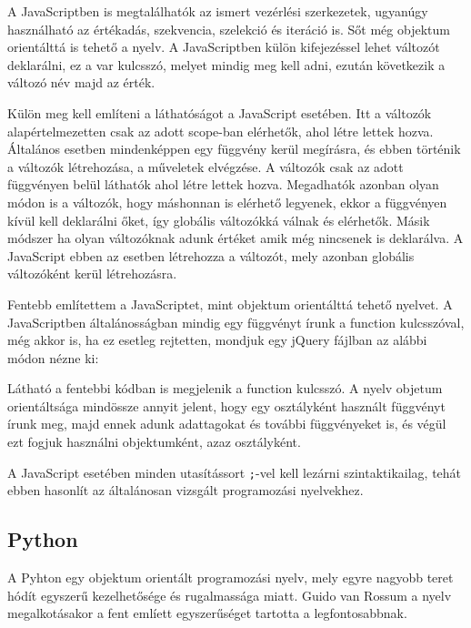 A JavaScriptben is megtalálhatók az ismert vezérlési szerkezetek, ugyanúgy használható az értékadás, szekvencia, szelekció és iteráció is. Sőt még objektum orientálttá is tehető a nyelv. A JavaScriptben külön kifejezéssel lehet változót deklarálni, ez a var kulcsszó, melyet mindig meg kell adni, ezután következik a változó név majd az érték.

Külön meg kell említeni a láthatóságot a JavaScript esetében. Itt a változók alapértelmezetten csak az adott scope-ban elérhetők, ahol létre lettek hozva. Általános esetben mindenképpen egy függvény kerül megírásra, és ebben történik a változók létrehozása, a műveletek elvégzése. A változók csak az adott függvényen belül láthatók ahol létre lettek hozva. Megadhatók azonban olyan módon is a változók, hogy máshonnan is elérhető legyenek, ekkor a függvényen kívül kell deklarálni őket, így globális változókká válnak és elérhetők. Másik módszer ha olyan változóknak adunk értéket amik még nincsenek is deklarálva. A JavaScript ebben az esetben létrehozza a változót, mely azonban globális változóként kerül létrehozásra.

Fentebb említettem a JavaScriptet, mint objektum orientálttá tehető nyelvet. A JavaScriptben általánosságban mindig egy függvényt írunk a function kulcsszóval, még akkor is, ha ez esetleg rejtetten, mondjuk egy jQuery fájlban az alábbi módon nézne ki:


Látható a fentebbi kódban is megjelenik a function kulcsszó. A nyelv objetum orientáltsága mindössze annyit jelent, hogy egy osztályként használt függvényt írunk meg, majd ennek adunk adattagokat és további függvényeket is, és végül ezt fogjuk használni objektumként, azaz osztályként.

A JavaScript esetében minden utasítássort \texttt{;}-vel kell lezárni szintaktikailag, tehát ebben hasonlít az általánosan vizsgált programozási nyelvekhez.

\subsection{Python}

A Pyhton egy objektum orientált programozási nyelv, mely egyre nagyobb teret hódít egyszerű kezelhetősége és rugalmassága miatt. Guido van Rossum a nyelv megalkotásakor a fent emlíett egyszerűséget tartotta a legfontosabbnak.


